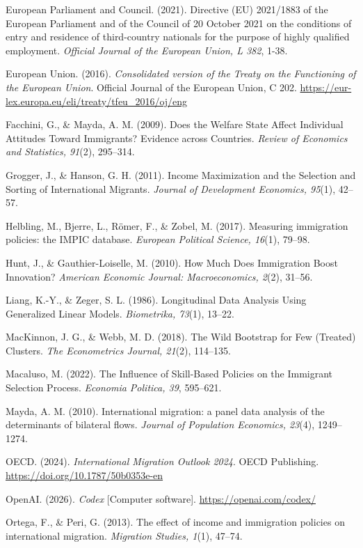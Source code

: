 \documentclass[11pt,a4paper]{article}
\newenvironment{hangrefs}{%
  \par\begingroup\setlength{\leftskip}{1.5em}\setlength{\parindent}{-1.5em}%
}{\par\endgroup}
\begin{document}
\begin{hangrefs}
European Parliament and Council. (2021). Directive (EU) 2021/1883 of the
European Parliament and of the Council of 20 October 2021 on the
conditions of entry and residence of third-country nationals for the
purpose of highly qualified employment. \emph{Official Journal of the
European Union, L 382}, 1-38.

European Union. (2016). \emph{Consolidated version of the Treaty on the
Functioning of the European Union}. Official Journal of the European
Union, C 202. \url{https://eur-lex.europa.eu/eli/treaty/tfeu_2016/oj/eng}

Facchini, G., \& Mayda, A. M. (2009). Does the Welfare State Affect
Individual Attitudes Toward Immigrants? Evidence across Countries.
\emph{Review of Economics and Statistics, 91}(2), 295--314.

Grogger, J., \& Hanson, G. H. (2011). Income Maximization and the
Selection and Sorting of International Migrants. \emph{Journal of
Development Economics, 95}(1), 42--57.

Helbling, M., Bjerre, L., Römer, F., \& Zobel, M. (2017). Measuring
immigration policies: the IMPIC database. \emph{European Political
Science, 16}(1), 79--98.

Hunt, J., \& Gauthier-Loiselle, M. (2010). How Much Does Immigration
Boost Innovation? \emph{American Economic Journal: Macroeconomics,
2}(2), 31--56.

Liang, K.-Y., \& Zeger, S. L. (1986). Longitudinal Data Analysis Using
Generalized Linear Models. \emph{Biometrika, 73}(1), 13--22.

MacKinnon, J. G., \& Webb, M. D. (2018). The Wild Bootstrap for Few
(Treated) Clusters. \emph{The Econometrics Journal, 21}(2), 114--135.

Macaluso, M. (2022). The Influence of Skill-Based Policies on the
Immigrant Selection Process. \emph{Economia Politica, 39}, 595--621.

Mayda, A. M. (2010). International migration: a panel data analysis of
the determinants of bilateral flows. \emph{Journal of Population
Economics, 23}(4), 1249--1274.

OECD. (2024). \emph{International Migration Outlook 2024}. OECD
Publishing. \url{https://doi.org/10.1787/50b0353e-en}

OpenAI. (2026). \emph{Codex} {[}Computer software{]}.
\url{https://openai.com/codex/}

Ortega, F., \& Peri, G. (2013). The effect of income and immigration
policies on international migration. \emph{Migration Studies, 1}(1),
47--74.


\end{hangrefs}
\end{document}
